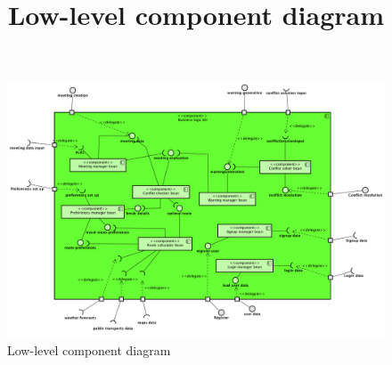 \title{Low-level component diagram}

\begin{figure}
	\centering
	\includegraphics[width=1.3\textwidth]{images/LLcomponentdiagram}
	\caption{Low-level component diagram}
	\label{fig:llcomponentdiagram}
\end{figure}

